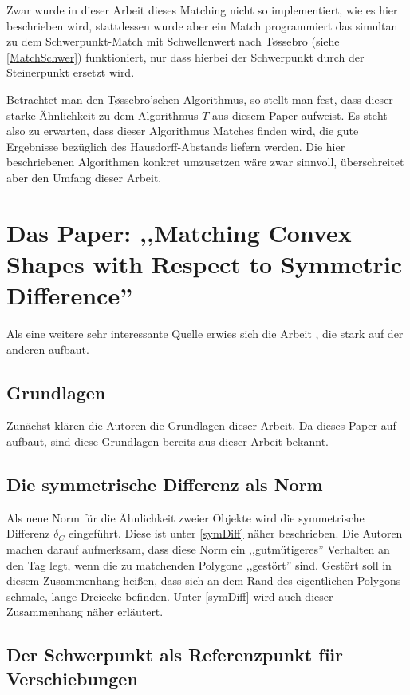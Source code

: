 Zwar wurde in dieser Arbeit dieses Matching nicht so implementiert, wie es hier beschrieben wird, stattdessen wurde aber ein Match programmiert das simultan zu dem Schwerpunkt-Match mit Schwellenwert nach T\o{}ssebro (siehe \vref{MatchSchwer}) funktioniert, nur dass hierbei der Schwerpunkt durch der Steinerpunkt ersetzt wird.

Betrachtet man den T\o{}ssebro'schen Algorithmus, so stellt man fest, dass dieser starke Ähnlichkeit zu dem Algorithmus $T$ aus diesem Paper aufweist. Es steht also zu erwarten, dass dieser Algorithmus Matches finden wird, die gute Ergebnisse bezüglich des Hausdorff-Abstands liefern werden. Die hier beschriebenen Algorithmen konkret umzusetzen wäre zwar sinnvoll, überschreitet aber den Umfang dieser Arbeit.

\section[Matching Shapes with Symmetric Difference]{Das Paper: ,,Matching Convex Shapes with Respect to Symmetric Difference'' }\label{AFRWW}

Als eine weitere sehr interessante Quelle erwies sich die Arbeit \cite{AFRW}, die stark auf der anderen aufbaut. 

\subsection{Grundlagen}

Zunächst klären die Autoren die Grundlagen dieser Arbeit. Da dieses Paper auf \cite{AAR} aufbaut, sind diese Grundlagen bereits aus dieser Arbeit bekannt. 

\subsection{Die symmetrische Differenz als Norm}

Als neue Norm für die Ähnlichkeit zweier Objekte wird die symmetrische Differenz $\delta_C$ eingeführt. Diese ist unter  \vref{symDiff} näher beschrieben. Die Autoren machen darauf aufmerksam, dass diese Norm ein ,,gutmütigeres'' Verhalten an den Tag legt, wenn die zu matchenden Polygone ,,gestört'' sind. Gestört soll in diesem Zusammenhang heißen, dass  sich an dem Rand des eigentlichen Polygons schmale, lange Dreiecke befinden. Unter \vref{symDiff} wird auch dieser Zusammenhang näher erläutert.

\subsection{Der Schwerpunkt als Referenzpunkt für Verschiebungen}

